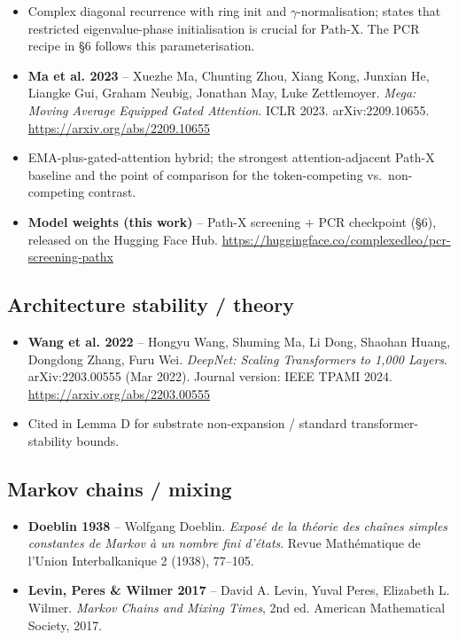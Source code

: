 \documentclass[11pt,a4paper]{article}
\theoremstyle{plain}
\theoremstyle{definition}
\begin{document}
\begin{itemize}
  \item Complex diagonal recurrence with ring init and $\gamma$-normalisation; states that restricted eigenvalue-phase initialisation is crucial for Path-X. The PCR recipe in \S{}6 follows this parameterisation.
  \item \textbf{Ma et al. 2023} -- Xuezhe Ma, Chunting Zhou, Xiang Kong, Junxian He, Liangke Gui, Graham Neubig, Jonathan May, Luke Zettlemoyer. \emph{Mega: Moving Average Equipped Gated Attention}. ICLR 2023. arXiv:2209.10655. \url{https://arxiv.org/abs/2209.10655}
  \item EMA-plus-gated-attention hybrid; the strongest attention-adjacent Path-X baseline and the point of comparison for the token-competing vs.\ non-competing contrast.
  \item \textbf{Model weights (this work)} -- Path-X screening $+$ PCR checkpoint (\S{}6), released on the Hugging Face Hub. \url{https://huggingface.co/complexedleo/pcr-screening-pathx}
\end{itemize}

\subsection*{Architecture stability / theory}
\begin{itemize}
  \item \textbf{Wang et al. 2022} -- Hongyu Wang, Shuming Ma, Li Dong, Shaohan Huang, Dongdong Zhang, Furu Wei. \emph{DeepNet: Scaling Transformers to 1,000 Layers}. arXiv:2203.00555 (Mar 2022). Journal version: IEEE TPAMI 2024. \url{https://arxiv.org/abs/2203.00555}
  \item Cited in Lemma D for substrate non-expansion / standard transformer-stability bounds.
\end{itemize}

\subsection*{Markov chains / mixing}
\begin{itemize}
  \item \textbf{Doeblin 1938} -- Wolfgang Doeblin. \emph{Exposé de la théorie des chaînes simples constantes de Markov à un nombre fini d'états}. Revue Mathématique de l'Union Interbalkanique 2 (1938), 77--105.
  \item \textbf{Levin, Peres \& Wilmer 2017} -- David A. Levin, Yuval Peres, Elizabeth L. Wilmer. \emph{Markov Chains and Mixing Times}, 2nd ed. American Mathematical Society, 2017.
\end{itemize}
\end{document}
